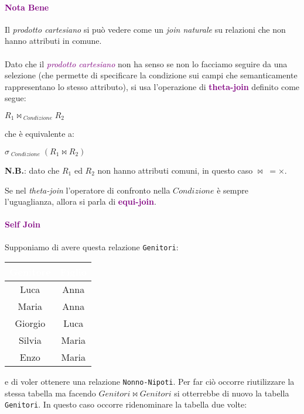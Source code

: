 \paragraph{\textcolor{purple}{Nota Bene}} Il \emph{prodotto cartesiano} si può
vedere come un \emph{join naturale} su relazioni che non hanno attributi in comune.
\\ \\
Dato che il \emph{\textcolor{purple}{prodotto cartesiano}} non ha senso se non
lo facciamo seguire da una selezione (che permette di specificare la condizione sui campi
che semanticamente rappresentano lo stesso attributo), si usa l'operazione di
\textbf{\textcolor{purple}{theta-join}} definito come segue:
\begin{center}
    $R_1 \bowtie_{\;Condizione} R_2$
\end{center}
che è equivalente a:
\begin{center}
    $\sigma_{\;Condizione}\;(R_1 \bowtie R_2)$
\end{center}
\textbf{N.B.}: dato che $R_1$ ed $R_2$ non hanno attributi comuni, in
questo caso $\bowtie \;= \times$.

Se nel \emph{theta-join} l'operatore di confronto nella $Condizione$ è sempre
l'uguaglianza, allora si parla di \textbf{\textcolor{purple}{equi-join}}.

\paragraph{\textcolor{purple}{Self Join}} Supponiamo di avere questa relazione \verb|Genitori|:
\begin{center}
    \begin{tabular}{|c|c|}
        \hline
        \rowcolor{purple}
        \textcolor{white}{Genitore} & \textcolor{white}{Figlio} \\
        \hline
        Luca & Anna \\
        \hline
        Maria & Anna \\
        \hline
        Giorgio & Luca \\
        \hline
        Silvia & Maria \\
        \hline
        Enzo & Maria \\
        \hline
    \end{tabular}
\end{center}

e di voler ottenere una relazione \verb|Nonno-Nipoti|. Per far ciò occorre riutilizzare la stessa
tabella ma facendo $Genitori \bowtie Genitori$ si otterrebbe di nuovo la tabella \verb|Genitori|.
In questo caso occorre ridenominare la tabella due volte:

